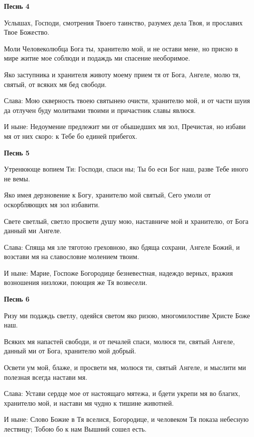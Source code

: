 \medskip\bfseries Песнь 4\normalfont{}


  Услышах, Господи, смотрения Твоего таинство, разумех дела Твоя, и прославих Твое Божество.


  Моли Человеколюбца Бога ты, хранителю мой, и не остави мене, но присно в мире житие мое соблюди и подаждь ми спасение необоримое.


  Яко заступника и хранителя животу моему прием тя от Бога, Aнгеле, молю тя, святый, от всяких мя бед свободи.


  Слава: Мою скверность твоею святынею очисти, хранителю мой, и от части шуия да отлучен буду молитвами твоими и причастник славы явлюся.


  И ныне: Недоумение предлежит ми от обышедших мя зол, Пречистая, но избави мя от них скоро: к Тебе бо единей прибегох.




\medskip \bfseries Песнь 5\normalfont{}


  Утренююще вопием Ти: Господи, спаси ны; Ты бо еси Бог наш, разве Тебе иного не вемы.


  Яко имея дерзновение к Богу, хранителю мой святый, Сего умоли от оскорбляющих мя зол избавити.


  Свете светлый, светло просвети душу мою, наставниче мой и хранителю, от Бога данный ми Aнгеле.


  Слава: Спяща мя зле тяготою греховною, яко бдяща сохрани, Aнгеле Божий, и возстави мя на славословие молением твоим.


  И ныне: Марие, Госпоже Богородице безневестная, надеждо верных, вражия возношения низложи, поющия же Тя возвесели.




\medskip
\bfseries Песнь 6\normalfont{}


  Ризу ми подаждь светлу, одеяйся светом яко ризою, многомилостиве Христе Боже наш.


  Всяких мя напастей свободи, и от печалей спаси, молюся ти, святый Aнгеле, данный ми от Бога, хранителю мой добрый.


  Освети ум мой, блаже, и просвети мя, молюся ти, святый Aнгеле, и мыслити ми полезная всегда настави мя.


  Слава: Устави сердце мое от настоящаго мятежа, и бдети укрепи мя во благих, хранителю мой, и настави мя чудно к тишине животней.


  И ныне: Слово Божие в Тя вселися, Богородице, и человеком Тя показа небесную лествицу; Тобою бо к нам Вышний сошел есть.




